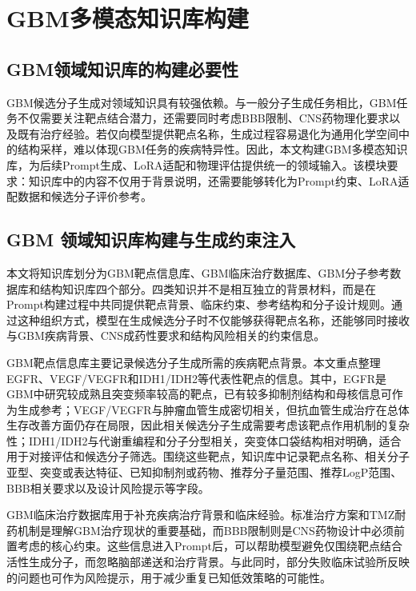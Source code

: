 \section{GBM多模态知识库构建}\label{sec:knowledge-base}

\subsection{GBM领域知识库的构建必要性}

GBM候选分子生成对领域知识具有较强依赖。与一般分子生成任务相比，GBM任务不仅需要关注靶点结合潜力，还需要同时考虑BBB限制、CNS药物理化要求以及既有治疗经验。若仅向模型提供靶点名称，生成过程容易退化为通用化学空间中的结构采样，难以体现GBM任务的疾病特异性。因此，本文构建GBM多模态知识库，为后续Prompt生成、LoRA适配和物理评估提供统一的领域输入。该模块要求：知识库中的内容不仅用于背景说明，还需要能够转化为Prompt约束、LoRA适配数据和候选分子评价参考。

\subsection{ GBM 领域知识库构建与生成约束注入}

本文将知识库划分为GBM靶点信息库、GBM临床治疗数据库、GBM分子参考数据库和结构知识库四个部分。四类知识并不是相互独立的背景材料，而是在Prompt构建过程中共同提供靶点背景、临床约束、参考结构和分子设计规则。通过这种组织方式，模型在生成候选分子时不仅能够获得靶点名称，还能够同时接收与GBM疾病背景、CNS成药性要求和结构风险相关的约束信息。

GBM靶点信息库主要记录候选分子生成所需的疾病靶点背景。本文重点整理EGFR、VEGF/VEGFR和IDH1/IDH2等代表性靶点的信息。其中，EGFR是GBM中研究较成熟且突变频率较高的靶点，已有较多抑制剂结构和母核信息可作为生成参考\cite{Fu2025}；VEGF/VEGFR与肿瘤血管生成密切相关，但抗血管生成治疗在总体生存改善方面仍存在局限，因此相关候选分子生成需要考虑该靶点作用机制的复杂性\cite{Fu2025}；IDH1/IDH2与代谢重编程和分子分型相关，突变体口袋结构相对明确，适合用于对接评估和候选分子筛选\cite{Fu2025}。围绕这些靶点，知识库中记录靶点名称、相关分子亚型、突变或表达特征、已知抑制剂或药物、推荐分子量范围、推荐LogP范围、BBB相关要求以及设计风险提示等字段。

GBM临床治疗数据库用于补充疾病治疗背景和临床经验。标准治疗方案和TMZ耐药机制是理解GBM治疗现状的重要基础\cite{Stupp2005}，而BBB限制则是CNS药物设计中必须前置考虑的核心约束\cite{Pardridge2012}。这些信息进入Prompt后，可以帮助模型避免仅围绕靶点结合活性生成分子，而忽略脑部递送和治疗背景。与此同时，部分失败临床试验所反映的问题也可作为风险提示，用于减少重复已知低效策略的可能性\cite{Fu2025}。

